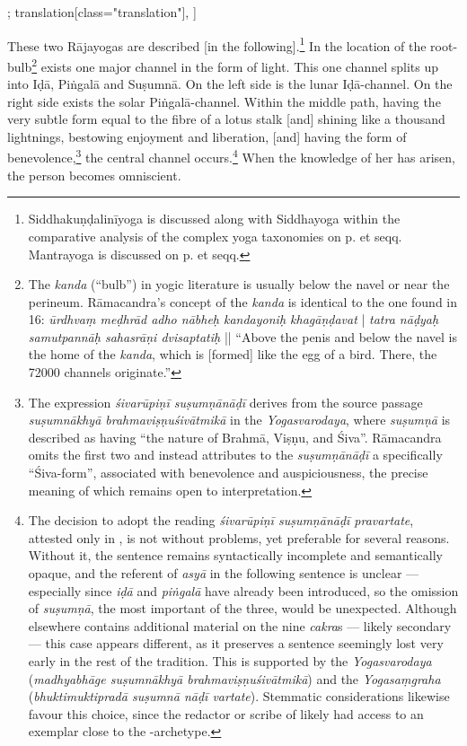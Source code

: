 \begin{alignment}[
    texts=edition[class="edition"];
    translation[class="translation"],
  ]
\begin{translation}
\begin{tlate}[p03_2]
\noindent These two Rājayogas are described [in the following].\footnote{Siddhakuṇḍalinīyoga is discussed along with Siddhayoga within the comparative analysis of the complex yoga taxonomies on p. \pageref{siddhayogaintro} et seqq. Mantrayoga is discussed on p. \pageref{mantrayogaintro} et seqq.} In the location of the root-bulb\footnote{The \textit{kanda} (``bulb'') in yogic literature is usually below the navel or near the perineum. Rāmacandra's concept of the \textit{kanda} is identical to the one found in  16: \textit{ūrdhvaṃ meḍhrād adho nābheḥ kandayoniḥ khagāṇḍavat} | \textit{tatra nāḍyaḥ samutpannāḥ sahasrāṇi dvisaptatiḥ} || ``Above the penis and below the navel is the home of the \textit{kanda}, which is [formed] like the egg of a bird. There, the 72000 channels originate.''} exists one major channel in the form of light. This one channel splits up into Iḍā, Piṅgalā and Suṣumnā. On the left side is the lunar Iḍā-channel. On the right side exists the solar Piṅgalā-channel. Within the middle path, having the very subtle form equal to the fibre of a lotus stalk [and] shining like a thousand lightnings, bestowing enjoyment and liberation, [and] having the form of benevolence,\footnote{The expression \textit{śivarūpiṇī suṣumṇānāḍī} derives from the source passage \textit{suṣumnākhyā brahmaviṣṇuśivātmikā} in the \emph{Yogasvarodaya}, where \textit{suṣumṇā} is described as having ``the nature of Brahmā, Viṣṇu, and Śiva''. Rāmacandra omits the first two and instead attributes to the \textit{suṣumṇānāḍī} a specifically ``Śiva-form'', associated with benevolence and auspiciousness, the precise meaning of which remains open to interpretation.} the central channel occurs.\footnote{The decision to adopt the reading \textit{śivarūpiṇī suṣumṇānāḍī pravartate}, attested only in , is not without problems, yet preferable for several reasons. Without it, the sentence remains syntactically incomplete and semantically opaque, and the referent of \textit{asyā} in the following sentence is unclear — especially since \textit{iḍā} and \textit{piṅgalā} have already been introduced, so the omission of \textit{suṣumṇā}, the most important of the three, would be unexpected. Although  elsewhere contains additional material on the nine \textit{cakra}s — likely secondary — this case appears different, as it preserves a sentence seemingly lost very early in the rest of the tradition. This is supported by the \emph{Yogasvarodaya} (\textit{madhyabhāge suṣumnākhyā brahmaviṣṇuśivātmikā}) and the \emph{Yogasaṃgraha} (\textit{bhuktimuktipradā suṣumnā nāḍī vartate}). Stemmatic considerations likewise favour this choice, since the redactor or scribe of  likely had access to an exemplar close to the \gamma-archetype.} When the knowledge of her has arisen, the person becomes omniscient.

\end{tlate}
\end{translation}
\end{alignment}
